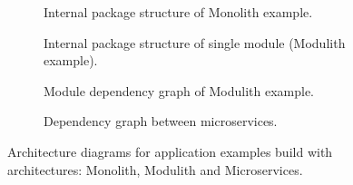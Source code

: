 \begin{figure}
    \centering
    \begin{subfigure}{.5\textwidth}
        \centering
        
        \caption{Internal package structure of Monolith example. \label{img:monolith_package}}
    \end{subfigure}%
    \begin{subfigure}{.5\textwidth}
        \centering
        
        \caption{Internal package structure of single module (Modulith example).\label{img:modulith_module_package}}
    \end{subfigure}
    \begin{subfigure}{\textwidth}
        \centering
        
        \caption{Module dependency graph of Modulith example. \label{img:modulith_package}}
    \end{subfigure}%
    \hfill
    \begin{subfigure}{\textwidth}
        \centering
        
        \caption{Dependency graph between microservices. \label{img:microservices_dependency}}
    \end{subfigure}
    \caption{Architecture diagrams for application examples build with architectures: Monolith, Modulith and Microservices.}
\end{figure}



